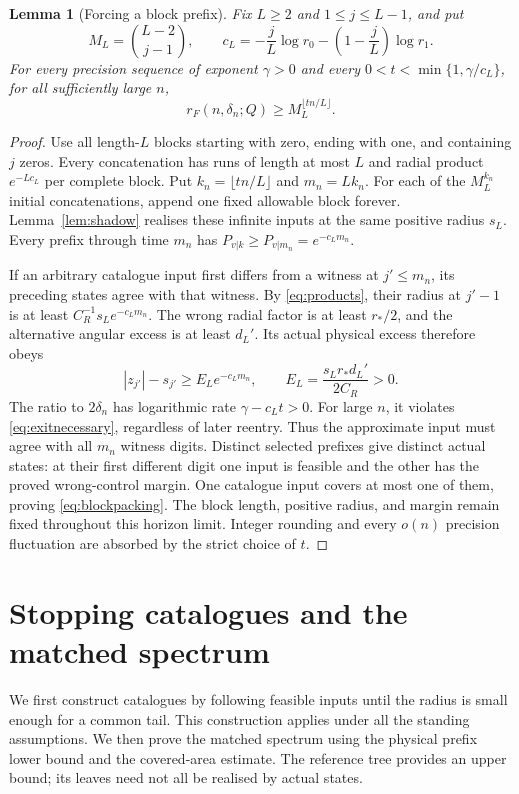 \documentclass[11pt]{amsart}
\newtheorem{lemma}[theorem]{Lemma}
\theoremstyle{definition}
\theoremstyle{remark}
\numberwithin{equation}{section}
\begin{document}
\begin{lemma}[Forcing a block prefix]\label{lem:prefixpacking}
Fix $L\ge2$ and $1\le j\le L-1$, and put
\[
M_L=\binom{L-2}{j-1},\qquad
c_L=-\frac jL\log r_0-\left(1-\frac jL\right)\log r_1.
\]
For every precision sequence of exponent $\gamma>0$ and every
$0<t<\min\{1,\gamma/c_L\}$, for all sufficiently large $n$,
\begin{equation}\label{eq:blockpacking}
r_F(n,\delta_n;Q)\ge M_L^{\lfloor tn/L\rfloor}.
\end{equation}
\end{lemma}
\begin{proof}
Use all length-$L$ blocks starting with zero, ending with one,
and containing $j$ zeros. Every concatenation has runs of length
at most $L$ and radial product $e^{-Lc_L}$ per complete block.
Put $k_n=\lfloor tn/L\rfloor$ and $m_n=Lk_n$.
For each of the $M_L^{k_n}$ initial concatenations, append one
fixed allowable block forever. Lemma~\ref{lem:shadow} realises
these infinite inputs at the same positive radius $s_L$.
Every prefix through time $m_n$ has
$P_{v|k}\ge P_{v|m_n}=e^{-c_Lm_n}$.

If an arbitrary catalogue input first differs from a witness at
$j'\le m_n$, its preceding states agree with that witness.
By \eqref{eq:products}, their radius at $j'-1$ is at least
$C_R^{-1}s_Le^{-c_Lm_n}$. The wrong radial factor is at least
$r_*/2$, and the alternative angular excess is at least $d_L'$.
Its actual physical excess therefore obeys
\begin{equation}\label{eq:physicalmargin}
|z_{j'}|-s_{j'}\ge E_Le^{-c_Lm_n},\qquad
E_L=\frac{s_Lr_*d_L'}{2C_R}>0.
\end{equation}
The ratio to $2\delta_n$ has logarithmic rate
$\gamma-c_Lt>0$. For large $n$, it violates
\eqref{eq:exitnecessary}, regardless of later reentry.
Thus the approximate input must agree with all $m_n$ witness digits.
Distinct selected prefixes give distinct actual states: at their
first different digit one input is feasible and the other has the
proved wrong-control margin. One catalogue input covers at most one
of them, proving \eqref{eq:blockpacking}.
The block length, positive radius, and margin remain fixed throughout
this horizon limit. Integer rounding and every $o(n)$ precision
fluctuation are absorbed by the strict choice of $t$.
\end{proof}

\section{Stopping catalogues and the matched spectrum}\label{sec:rates}
We first construct catalogues by following feasible inputs until the
radius is small enough for a common tail. This construction applies
under all the standing assumptions. We then prove the matched spectrum
using the physical prefix lower bound and the covered-area estimate.
The reference tree provides an upper bound; its leaves need not all
be realised by actual states.
\end{document}
